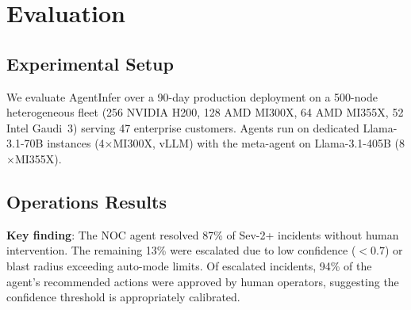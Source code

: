 \documentclass[conference,10pt,letterpaper]{IEEEtran}
\begin{document}
\section{Evaluation}
\label{sec:eval}

\subsection{Experimental Setup}

We evaluate AgentInfer over a 90-day production deployment on a 500-node heterogeneous fleet (256 NVIDIA H200, 128 AMD MI300X, 64 AMD MI355X, 52 Intel Gaudi~3) serving 47 enterprise customers. Agents run on dedicated Llama-3.1-70B instances (4$\times$MI300X, vLLM) with the meta-agent on Llama-3.1-405B (8$\times$MI355X).

\subsection{Operations Results}

\begin{table}[!t]
\caption{Operations Agent Performance (90-day)}
\label{tab:ops_results}
\centering\scriptsize
{}
\end{table}

\textbf{Key finding}: The NOC agent resolved 87\% of Sev-2+ incidents without human intervention. The remaining 13\% were escalated due to low confidence ($< 0.7$) or blast radius exceeding auto-mode limits. Of escalated incidents, 94\% of the agent's recommended actions were approved by human operators, suggesting the confidence threshold is appropriately calibrated.
\end{document}
